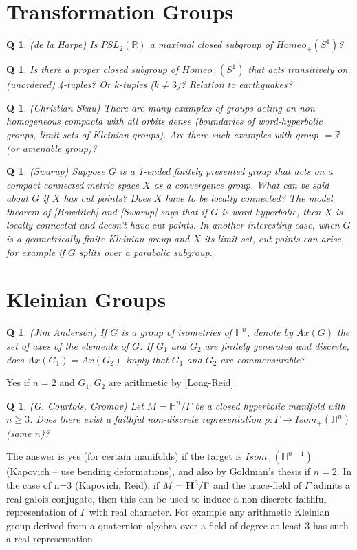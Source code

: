 \documentclass[11pt]{article}
\newtheorem{q}[thm]{Q}
\theoremstyle{remark}
\def\b{\begin{q}}
\def\e{\end{q}}
\def\R{{\mathbb R}}
\def\Z{{\mathbb Z}}
\def\H{{\mathbb H}}
\newcommand{\<}{\langle}
\renewcommand{\>}{\rangle}
\begin{document}
\section{Transformation Groups}


\b
(de la Harpe) Is $PSL_2(\R)$ a maximal closed subgroup of
$Homeo_+(S^1)$? \e

\b Is there a proper closed subgroup of $Homeo_+(S^1)$ that acts transitively
on (unordered) 4-tuples? Or $k$-tuples ($k\neq 3$)? Relation to earthquakes?
\e

\b
(Christian Skau) There are many examples of groups acting on
non-homogeneous compacta with all orbits dense (boundaries of
word-hyperbolic groups, limit sets of Kleinian groups). Are there such
examples with group $=\Z$ (or amenable group)?\e

\b
(Swarup) Suppose $G$ is a 1-ended finitely presented group that
acts on a compact connected metric space $X$ as a convergence
group. What can be said about $G$ if $X$ has cut points? Does $X$ have
to be locally connected?  The model theorem of [Bowditch] and [Swarup]
says that if $G$ is word hyperbolic, then $X$ is locally connected and
doesn't have cut points.  In another interesting case, when $G$ is a
geometrically finite Kleinian group and $X$ its limit set, cut points
can arise, for example if $G$ splits over a parabolic subgroup.\e

\section{Kleinian Groups}


\b
(Jim Anderson) If $G$ is a group of isometries of $\H^n$, denote
by $Ax(G)$ the set of axes of the elements of $G$. If $G_1$ and $G_2$ are
finitely generated and discrete, does $Ax(G_1)=Ax(G_2)$ imply that $G_1$
and $G_2$ are commensurable?\e
 Yes if $n=2$ and $G_1,G_2$ are arithmetic by
[Long-Reid].

\b (G. Courtois, Gromov) Let $M=\H^n/\Gamma$ be a closed hyperbolic
manifold with $n\geq 3$. Does there exist a faithful non-discrete
representation $\rho:\Gamma\to Isom_+(\H^n)$ (same $n$)?  \e The
answer is yes (for certain manifolds) if the target is
$Isom_+(\H^{n+1})$ (Kapovich -- use bending deformations), and also by
Goldman's thesis if $n=2$. In the case of n=3 (Kapovich, Reid), if $M = {\bf
H}^3/\Gamma$ and the trace-field of $\Gamma$ admits a real galois
conjugate, then this can be used to induce a non-discrete faithful
representation of $\Gamma$ with real character. For example any
arithmetic Kleinian group derived from a quaternion algebra over a
field of degree at least $3$ has such a real representation.
\end{document}
